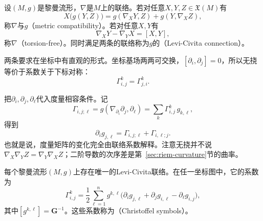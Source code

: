\begin{definition}[度量相容与无挠]
\label{def:riem-compatible-torsion-free}
设$(M,g)$是黎曼流形，$\nabla$是$M$上的联络。若对任意$X,Y,Z\in\mathfrak X(M)$有
\begin{equation}
X\bigl(g(Y,Z)\bigr)=g(\nabla_XY,Z)+g(Y,\nabla_XZ),
\label{eq:riem-metric-compatible}
\end{equation}
称$\nabla$与$g$（metric compatibility）。若对任意$X,Y$有
\begin{equation}
\nabla_XY-\nabla_YX=[X,Y],
\label{eq:riem-torsion-free}
\end{equation}
称$\nabla$（torsion-free）。同时满足两条的联络称为$g$的（Levi-Civita connection）。
\end{definition}

两条要求在坐标中有直观的形式。坐标基场两两可交换，$[\partial_i,\partial_j]=0$，所以无挠等价于系数关于下标对称：
\begin{equation}
\Gamma^k_{i,j}=\Gamma^k_{j,i}.
\label{eq:riem-christoffel-symmetry}
\end{equation}

把$\partial_i,\partial_j,\partial_\ell$代入度量相容条件。记
\[
\Gamma_{i,j;\ell}=g(\nabla_{\partial_i}\partial_j,\partial_\ell)=\sum_k\Gamma^k_{i,j}\,g_{k,\ell},
\]
得到
\begin{equation}
\partial_ig_{j,\ell}=\Gamma_{i,j;\ell}+\Gamma_{i,\ell;j}.
\label{eq:riem-compatible-coordinates}
\end{equation}
也就是说，度量矩阵的变化完全由联络系数解释。注意无挠并不说$\nabla_X\nabla_YZ=\nabla_Y\nabla_XZ$；二阶导数的次序差是第~\ref{sec:riem-curvature}节的曲率。

\begin{theorem}
\label{thm:riem-levi-civita}
每个黎曼流形$(M,g)$上存在唯一的Levi-Civita联络。在任一坐标图中，它的系数为
\begin{equation}
\Gamma^k_{i,j}=\frac12\sum_{\ell=1}^ng^{k,\ell}\bigl(\partial_ig_{j,\ell}+\partial_jg_{i,\ell}-\partial_\ell g_{i,j}\bigr),
\label{eq:riem-christoffel}
\end{equation}
其中$[g^{k,\ell}]=\bm G^{-1}$。这些系数称为（Christoffel symbols）。
\end{theorem}

